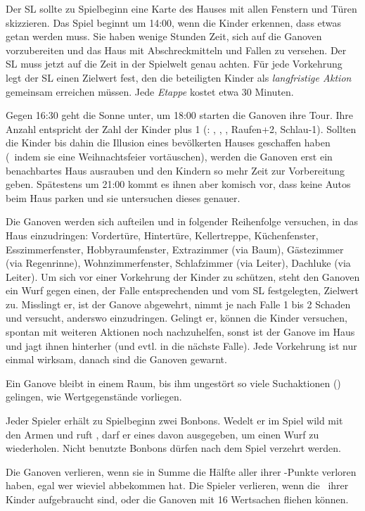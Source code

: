 {	

		\noindent
		Der SL sollte zu Spielbeginn eine Karte des Hauses mit allen Fenstern und Türen skizzieren. Das Spiel beginnt um 14:00, wenn die Kinder erkennen, dass etwas getan werden muss. Sie haben wenige Stunden Zeit, sich auf die Ganoven vorzubereiten und das Haus mit Abschreckmitteln und Fallen zu versehen. Der SL muss jetzt auf die Zeit in der Spielwelt genau achten. Für jede Vorkehrung legt der SL einen Zielwert fest, den die beteiligten Kinder als \emph{langfristige Aktion} gemeinsam erreichen müssen. Jede \emph{Etappe} kostet etwa 30 Minuten.

		Gegen 16:30 geht die Sonne unter, um 18:00 starten die Ganoven ihre Tour. Ihre Anzahl entspricht der Zahl der Kinder plus 1 (: , , , Raufen+2, Schlau-1). Sollten die Kinder bis dahin die Illusion eines  bevölkerten Hauses geschaffen haben (\zB~indem sie eine Weihnachtsfeier vortäuschen), werden die Ganoven erst ein benachbartes Haus ausrauben und den Kindern so mehr Zeit zur Vorbereitung geben. Spätestens um 21:00 kommt es ihnen aber komisch vor, dass keine Autos beim Haus parken und sie untersuchen dieses genauer.

		Die Ganoven werden sich aufteilen und in folgender Reihenfolge versuchen, in das Haus einzudringen: Vordertüre, Hintertüre, Kellertreppe, Küchenfenster, Esszimmerfenster, Hobbyraumfenster, Extrazimmer (via Baum), Gästezimmer (via Regenrinne), Wohnzimmerfenster, Schlafzimmer (via Leiter), Dachluke (via Leiter). Um sich vor einer Vorkehrung der Kinder zu schützen, steht den Ganoven ein Wurf gegen einen, der Falle entsprechenden und vom SL festgelegten, Zielwert zu. Misslingt er, ist der Ganove abgewehrt, nimmt je nach Falle 1 bis 2 Schaden und versucht, anderswo einzudringen. Gelingt er, können die Kinder versuchen, spontan mit weiteren Aktionen noch nachzuhelfen, sonst ist der Ganove im Haus und jagt ihnen hinterher (und evtl. in die nächste Falle). Jede Vorkehrung ist nur einmal wirksam, danach sind die Ganoven gewarnt.

		Ein Ganove bleibt in einem Raum, bis ihm ungestört so viele Suchaktionen () gelingen, wie Wertgegenstände vorliegen.


		\noindent
		Jeder Spieler erhält zu Spielbeginn zwei Bonbons. Wedelt er im Spiel wild mit den Armen und ruft , darf er eines davon ausgegeben, um einen Wurf zu wiederholen. Nicht benutzte Bonbons dürfen nach dem Spiel verzehrt werden.


		\noindent
		Die Ganoven verlieren, wenn sie in Summe die Hälfte aller ihrer \HD-Punkte verloren haben, egal wer wieviel abbekommen hat. Die Spieler verlieren, wenn die \HD\ ihrer Kinder aufgebraucht sind, oder die Ganoven mit 16 Wertsachen fliehen können.

}
